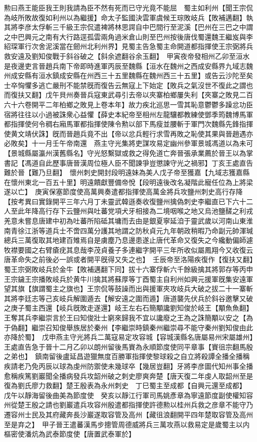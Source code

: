 勲曰燕王能臣我王則我請為臣不然有死而已守光竟不能屈　蜀主如利州【聞王宗侃為岐所敗故復如利州以為繼援】命太子監國決雲軍虞候王琮敗岐兵【敗補邁翻】執其將李彦太俘斬三千級王宗侃遣裨將林思諤自中巴間行至泥溪【巴州在三巴之中謂之中巴興元之南有大行路逕孤雲兩角過米倉山則至巴州按後唐伐蜀還魏王繼岌與李紹琛軍行次舍泥溪當在劒州北利州界】見蜀主告急蜀主命開道都指揮使王宗弼將兵救安遠及劉知俊戰于斜谷破之【斜余遮翻谷余玉翻】　甲寅夜帝發相州乙卯至洹水是夜邊吏言晉趙兵南下帝即時進軍丙辰至魏縣【洹水在魏州之西成安縣界九域志魏州成安縣有洹水鎮成安縣在州西三十五里魏縣在魏州西三十五里】或告云沙陀至矣士卒恟懼多逃亡嚴刑不能禁旣而復告云無寇上下始定【敗兵之氣沒世不復此之謂也而復扶又翻】戊午貝州奏晉兵寇東武尋引去帝以夾寨柏鄉屢失利【夾寨之敗見二百六十六卷開平二年柏鄉之敗見上卷本年】故力疾北巡思一雪其恥意鬱鬱多躁忿功臣宿將往往以小過被誅衆心益懼【薛史本紀帝至相州左龍驤都教練使鄧季筠魏博馬軍都指揮使何令稠右廂馬軍都指揮使陳令勲以部下馬瘦並腰斬于軍門次魏縣先鋒指揮使黄文靖伏誅】旣而晉趙兵竟不出【帝以忿兵輕行求雪再敗之恥使其果與晉趙遇亦必敗矣】十一月壬午帝南還　燕主守光集將吏謀攻易定幽州參軍景城馮道以為未可【景城縣屬瀛州漢舊縣名】守光怒繫獄或救之得免道亡奔晉張承業薦於晉王以為掌書記【馮道自此歷事唐晉漢周位極人臣不聞諫爭豈懲諫守光之禍邪】丁亥王處直告難於晉【難乃旦翻】　懷州刺史開封段明遠妹為美人戊子帝至獲嘉【九域志獲嘉縣在懷州東北一百五十里】明遠饋獻豐備帝悅【段明遠後改名凝階此寵任位為上將梁遂以亡】　庚寅保塞節度使高萬興奏遣都指揮使高萬金將兵攻鹽州刺史高行存降【按考異曰實錄開平三年六月丁未靈武韓遜奏收復鹽州擒偽刺史李繼直已下六十二人至此年降高行存下云鹽州與吐蕃党項犬牙相接為二境咽喉之地又烏池鹽醝之利戎羌意未嘗息唐建中初為吐蕃所陷砥其墉而去由是銀夏寧延洎于靈武歲以河南山東淮南青徐江浙等道兵士不啻四萬分護其地謂之防秋貞元九年朝政稍暇乃命副元帥渾瑊總兵三萬復取其地建百雉焉自是虜塵乃息邊患遂止唐代革命又復失之今纔動偏師遽牧襟要國之右臂瘡疣其息哉李茂貞養子多連繼字開平三年所收似屬鳳翔今又收復云唐革命失之前後必一誤或者開平旣得又失之也】　壬辰帝至洛陽疾復作【復扶又翻】　蜀王宗弼敗岐兵於金牛【敗補邁翻下同】拔十六寨俘斬六千餘級擒其將郭存等丙申王宗鐬王宗播敗岐兵於黄牛川擒其將蘇厚等丁酉蜀主自利州如興元援軍旣集安遠軍望其旗【旗謂蜀主之旗也】王宗侃等鼓譟而出與援軍夾攻岐兵大破之拔二十一寨斬其將李廷志等己亥岐兵解圍遁去【解安遠之圍而遁】唐道襲先伏兵於斜谷邀擊又破之庚子蜀主西還【岐兵旣敗走遂還】岐王左右石簡顒讒劉知俊於岐王【顒魚魚翻】王奪其兵李繼崇言於王曰知俊壯士窮來歸我不宜以讒廢之王為之誅簡顒以安之【為于偽翻】繼崇召知俊舉族居於秦州【李繼崇時鎮秦州繼崇尋不能守秦州劉知俊由此亦降於蜀】　戊申燕主守光將兵二萬寇易定攻容城【容城漢縣名唐屬易州宋屬雄州】王處直告急于晉十二月乙卯以朗州留後馬賨為永順節度使同平章事【賨徂宗翻馬殷之弟也】　鎮南留後盧延昌遊獵無度百勝軍指揮使黎球殺之自立將殺譚全播全播稱疾請老乃免丙辰以球為虔州防禦使未幾球卒【幾居豈翻】牙將李彦圖代知州事全播愈稱疾篤劉巖聞全播病發兵攻韶州破之刺史廖爽奔楚【唐天復二年虔人取韶州至是復為劉氏廖力救翻】楚王殷表為永州刺史　丁巳蜀主至成都【自興元還至成都】　戊午以靜海留後曲美為節度使　癸亥以靜江行軍司馬姚彥章為寧遠節度副使權知容州從楚王殷之請也劉巖遣兵攻容州殷遣都指揮使許德勲以桂州兵救之彦章不能守乃遷容州士民及其府藏奔長沙巖遂取容管及高州【藏徂浪翻開平四年楚取容管及高州至是弃之】　甲子晉王遣蕃漢馬步摠管周德威將兵三萬攻燕以救易定是歲蜀主以内樞密使潘炕為武泰節度使【唐置武泰軍於】

